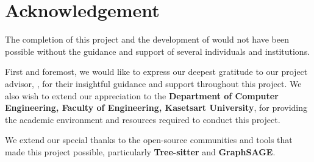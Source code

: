 \chapter*{Acknowledgement}
\label{chap:acknowledgement}

The completion of this project and the development of \textbf{\usevar{\srsNickName}} would not have been possible
without the guidance and support of several individuals and institutions.

First and foremost, we would like to express our deepest gratitude to our project advisor,
\textbf{\usevar{\srsAdvisorName}}, for their insightful guidance and support throughout this project.
We also wish to extend our appreciation to the \textbf{Department of Computer Engineering, Faculty of Engineering, Kasetsart University},
for providing the academic environment and resources required to conduct this project.

We extend our special thanks to the open-source communities and tools that made this project possible,
particularly \textbf{Tree-sitter} and \textbf{GraphSAGE}.


\vspace{.2in}
\begin{flushright}
    \usevar{\srsAuthorOne} \\
    \usevar{\srsAuthorTwo} \\
    \usevar{\srsAuthorThree}
\end{flushright}
